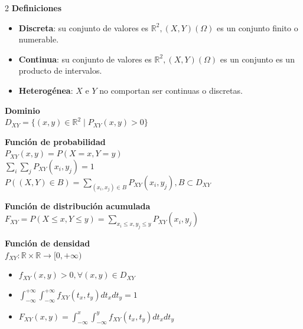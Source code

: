 \documentclass[10pt,a4paper]{article}
\begin{document}
\pagebreak


\begin{tcolorbox}[title=Variables Aleatorias Bidimensionales]
    \begin{multicols}{2}
        \textbf{Definiciones}
        \begin{itemize}
            \item \textbf{Discreta}: su conjunto de valores es $\mathbb{R}^2, (X, Y)(\Omega)$ es un conjunto finito o numerable.
            \item \textbf{Continua}: su conjunto de valores es $\mathbb{R}^2, (X, Y)(\Omega)$ es un conjunto es un producto de intervalos.
            \item \textbf{Heterogénea}: $X$ e $Y$ no comportan ser continuas o discretas.
        \end{itemize}
    
        \textbf{Dominio} \\
        $D_{XY} = \{(x, y) \in \mathbb{R}^2 \mid P_{XY}(x, y) > 0\}$
    
        \textbf{Función de probabilidad} \\
        $P_{XY}(x, y) = P(X = x, Y = y)$ \\
        $\sum\limits_i\sum\limits_j P_{XY}(x_i, y_j) = 1$ \\
        $P((X, Y) \in B) = \sum\limits_{(x_i, x_j) \in B} P_{XY}(x_i, y_j), B \subset D_{XY}$

        \columnbreak
    
        \textbf{Función de distribución acumulada} \\
        $F_{XY} = P(X \leq x, Y \leq y) = \sum\limits_{x_i \leq x, y_j \leq y} P_{XY}(x_i, y_j)$
    
        \textbf{Función de densidad} \\
        $f_{XY} : \mathbb{R} \times \mathbb{R} \to [0, +\infty)$ \\
        \begin{itemize}
            \item $f_{XY}(x, y) > 0, \forall (x, y) \in D_{XY}$
            \item $\int_{-\infty}^{+\infty} \int_{-\infty}^{+\infty} f_{XY}(t_x, t_y)dt_x dt_y = 1$
            \item $F_{XY}(x, y) = \int_{-\infty}^{x} \int_{-\infty}^{y} f_{XY}(t_x, t_y)dt_x dt_y$
        \end{itemize}
    \end{multicols}
\end{tcolorbox}
\end{document}
